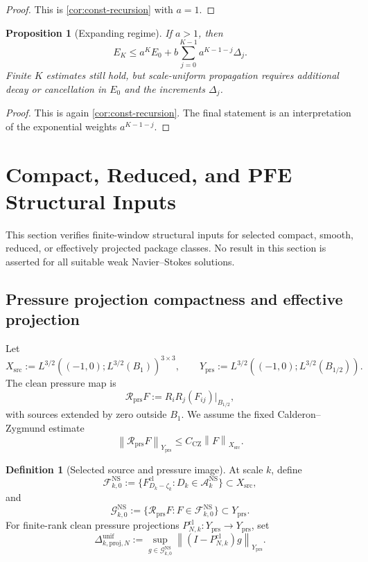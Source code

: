 \documentclass[11pt]{article}
\numberwithin{equation}{section}
\theoremstyle{plain}
\newtheorem{proposition}[theorem]{Proposition}
\theoremstyle{definition}
\newtheorem{definition}[theorem]{Definition}
\theoremstyle{remark}
\newcommand{\NS}{\mathrm{NS}}
\newcommand{\cl}{\mathrm{cl}}
\newcommand{\prs}{\mathrm{prs}}
\newcommand{\proj}{\mathrm{proj}}
\newcommand{\A}{\mathcal A}
\newcommand{\F}{\mathcal F}
\newcommand{\Rprs}{\mathcal R_{\prs}}
\newcommand{\norm}[1]{\left\lVert #1\right\rVert}
\begin{document}
\begin{proof}
This is \cref{cor:const-recursion} with \(a=1\).
\end{proof}

\begin{proposition}[Expanding regime]\label{prop:expanding}
If \(a>1\), then
\[
  E_K
  \le
  a^K E_0+b\sum_{j=0}^{K-1}a^{K-1-j}\Delta_j.
\]
Finite \(K\) estimates still hold, but scale-uniform propagation requires
additional decay or cancellation in \(E_0\) and the increments
\(\Delta_j\).
\end{proposition}

\begin{proof}
This is again \cref{cor:const-recursion}.  The final statement is an
interpretation of the exponential weights \(a^{K-1-j}\).
\end{proof}


\section{Compact, Reduced, and PFE Structural Inputs}

This section verifies finite-window structural inputs for selected compact,
smooth, reduced, or effectively projected package classes.  No result in
this section is asserted for all suitable weak Navier--Stokes solutions.

\subsection{Pressure projection compactness and effective projection}

Let
\[
  X_{\mathrm{src}}
  :=
  L^{3/2}((-1,0);L^{3/2}(B_1))^{3\times3},
  \qquad
  Y_{\prs}
  :=
  L^{3/2}((-1,0);L^{3/2}(B_{1/2})).
\]
The clean pressure map is
\[
  \Rprs F:=R_iR_j(F_{ij})\big|_{B_{1/2}},
\]
with sources extended by zero outside \(B_1\).  We assume the fixed
Calderon--Zygmund estimate
\[
  \norm{\Rprs F}_{Y_{\prs}}\le C_{\mathrm{CZ}}\norm{F}_{X_{\mathrm{src}}}.
\]

\begin{definition}[Selected source and pressure image]\label{def:selected-source}
At scale \(k\), define
\[
  \F_{k,0}^{\NS}
  :=
  \{F_{D_k-\zeta_k}^{\cl}:D_k\in\A_k^{\NS}\}
  \subset X_{\mathrm{src}},
\]
and
\[
  \mathcal G_{k,0}^{\NS}
  :=
  \{\Rprs F:F\in\F_{k,0}^{\NS}\}
  \subset Y_{\prs}.
\]
For finite-rank clean pressure projections \(P_{N,k}^{\cl}:Y_{\prs}\to
Y_{\prs}\), set
\[
  \Delta_{k,\proj,N}^{\mathrm{unif}}
  :=
  \sup_{g\in\mathcal G_{k,0}^{\NS}}
  \norm{(I-P_{N,k}^{\cl})g}_{Y_{\prs}}.
\]
\end{definition}
\end{document}
